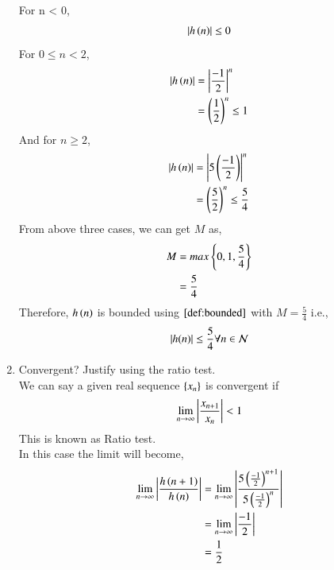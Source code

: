 \documentclass[journal,12pt,twocolumn]{IEEEtran}
\renewcommand\thesection{\arabic{section}}
\begin{document}
\begin{enumerate}[label=\thesection.\arabic*]
           For n < 0,
           \begin{align}
                \left\vert h\left(n\right)\right\vert \leq 0
           \end{align}
           For $0 \leq n <2$,
           \begin{align}
                \left\vert h\left(n\right)\right\vert & = \left\vert\frac{-1}{2}\right\vert^{n}        \\
                                & = \left(\frac{1}{2}\right)^{n} \leq 1
           \end{align}
           And for $n \geq 2$,
           \begin{align}
                \left\vert h\left(n\right)\right\vert & = \left\vert5\left(\frac{-1}{2}\right)\right\vert^{n}          \\
                                & = \left(\frac{5}{2}\right)^{n} \leq \frac{5}{4}
           \end{align}
           From above three cases, we can get $M$ as,
           \begin{align}
                M & = max\left\{0,1,\frac{5}{4}\right\} \\
                  & = \frac{5}{4}
           \end{align}
           Therefore, $h\left(n\right)$ is bounded using $\eqref{def:bounded}$ with $M = \frac{5}{4}$ i.e.,
           \begin{align}
                \left\vert h(n)\right\vert \leq \frac{5}{4}  \forall n \in \mathcal{N}
           \end{align}
     \item Convergent? Justify using the ratio test.\\
           \solution We can say a given real sequence $\left\{x_n\right\}$ is convergent if
           \begin{align}
                \lim_{n \rightarrow \infty}\left\vert\frac{x_{n+1}}{x_n}\right\vert < 1
           \end{align}
           This is known as Ratio test.\\
           In this case the limit will become,
           \begin{align}
                \lim_{n \rightarrow \infty}\abs{\frac{h\brak{n+1}}{h\brak{n}}} & = \lim_{n \rightarrow \infty}\abs{\frac{5\brak{\frac{-1}{2}}^{n+1}}{5\brak{\frac{-1}{2}}^{n}}} \\
                                                                               & = \lim_{n \rightarrow \infty}\abs{\frac{-1}{2}}                                                \\
                                                                               & = \frac{1}{2}

\end{align}
\end{enumerate}
\end{document}
